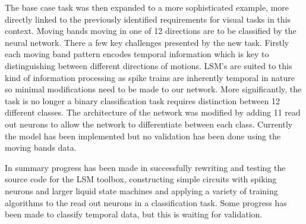 \documentclass[fleqn,12pt]{wlscirep}
\begin{document}
The base case task was then expanded to a more sophisticated example, more directly linked to the previously identified requirements for visual tasks in this context. Moving bands moving in one of 12 directions are to be classified by the neural network. There a few key challenges presented by the new task. Firstly each moving band pattern encodes temporal information which is key to distinguishing between different directions of motions. LSM’s are suited to this kind of information processing as spike trains are inherently temporal in nature so minimal modifications need to be made to our network. More significantly, the task is no longer a binary classification task requires distinction between 12 different classes. The architecture of the network was modified by adding 11 read out neurons to allow the network to differentiate between each class. Currently the model has been implemented but no validation has been done using the moving bands data.

In summary progress has been made in successfully rewriting and testing the source code for the LSM toolbox, constructing simple circuits with spiking neurons and larger liquid state machines and applying a variety of training algorithms to the read out neurons in a classification task. Some progress has been made to classify temporal data, but this is waiting for validation.
\end{document}
